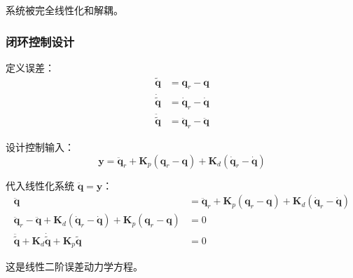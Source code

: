 \documentclass[12pt,a4paper]{article}
\begin{document}
系统被完全线性化和解耦。

\subsubsection{闭环控制设计}

定义误差：
\begin{align}
\tilde{\mathbf{q}} &= \mathbf{q}_r - \mathbf{q} \\
\dot{\tilde{\mathbf{q}}} &= \dot{\mathbf{q}}_r - \dot{\mathbf{q}} \\
\ddot{\tilde{\mathbf{q}}} &= \ddot{\mathbf{q}}_r - \ddot{\mathbf{q}}
\end{align}

设计控制输入：
\begin{equation}
\mathbf{y} = \ddot{\mathbf{q}}_r + \mathbf{K}_p(\mathbf{q}_r - \mathbf{q}) + \mathbf{K}_d(\dot{\mathbf{q}}_r - \dot{\mathbf{q}})
\label{eq:y_design}
\end{equation}

代入线性化系统 $\ddot{\mathbf{q}} = \mathbf{y}$：
\begin{align*}
\ddot{\mathbf{q}} &= \ddot{\mathbf{q}}_r + \mathbf{K}_p(\mathbf{q}_r - \mathbf{q}) + \mathbf{K}_d(\dot{\mathbf{q}}_r - \dot{\mathbf{q}}) \\
\ddot{\mathbf{q}}_r - \ddot{\mathbf{q}} + \mathbf{K}_d(\dot{\mathbf{q}}_r - \dot{\mathbf{q}}) + \mathbf{K}_p(\mathbf{q}_r - \mathbf{q}) &= 0 \\
\ddot{\tilde{\mathbf{q}}} + \mathbf{K}_d\dot{\tilde{\mathbf{q}}} + \mathbf{K}_p\tilde{\mathbf{q}} &= 0
\label{eq:error_dynamics}
\end{align*}

这是线性二阶误差动力学方程。
\end{document}
